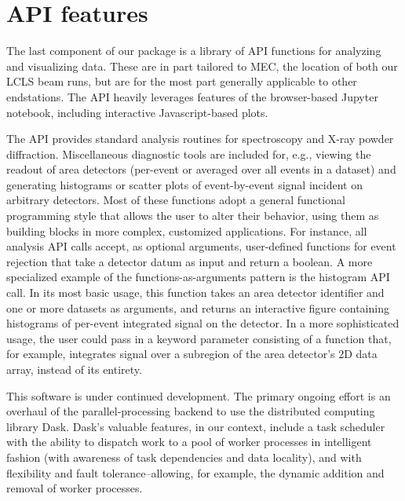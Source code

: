 \section{API features}
The last component of our package is a library of API functions for analyzing and visualizing data. These are in part tailored to MEC, the location of both our LCLS beam runs, but are for the most part generally applicable to other endstations. The API heavily leverages features of the browser-based Jupyter notebook, including interactive Javascript-based plots.


The API provides standard analysis routines for spectroscopy and X-ray powder diffraction. Miscellaneous diagnostic tools are included for, e.g., viewing the readout of area detectors (per-event or averaged over all events in a dataset) and generating histograms or scatter plots of event-by-event signal incident on arbitrary detectors. Most of these functions adopt a general functional programming style that allows the user to alter their behavior, using them as building blocks in more complex, customized applications. For instance, all analysis API calls accept, as optional arguments, user-defined functions for event rejection that take a detector datum as input and return a boolean. A more specialized example of the functions-as-arguments pattern is the histogram API call. In its most basic usage, this function takes an area detector identifier and one or more datasets as arguments, and returns an interactive figure containing histograms of per-event integrated signal on the detector. In a more sophisticated usage, the user could pass in a keyword parameter consisting of a function that, for example, integrates signal over a subregion of the area detector's 2D data array, instead of its entirety. 

This software is under continued development. The primary ongoing effort is an overhaul of the parallel-processing backend to use the distributed computing library Dask. Dask's valuable features, in our context, include a task scheduler with the ability to dispatch work to a pool of worker processes in intelligent fashion (with awareness of task dependencies and data locality), and with flexibility and fault tolerance--allowing, for example, the dynamic addition and removal of worker processes. 

